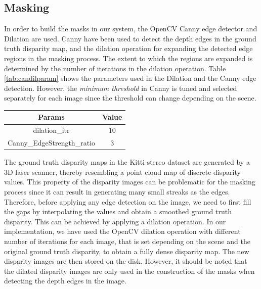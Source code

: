 \subsection{Masking}
In order to build the masks in our system, the OpenCV Canny edge detector and Dilation are used.
Canny have been used to detect the depth edges in the ground truth disparity map, and the dilation operation 
for expanding the detected edge regions in the masking process. The extent to which the regions are expanded
is determined by the number of iterations in the dilation operation. Table \ref{tab:candilparam} shows the parameters used in the Dilation
and the Canny edge detection. However, the \textit{minimum threshold} in Canny is tuned and selected separately for each image 
since the threshold can change depending on the scene.

{\footnotesize
\begin{minipage}{\linewidth}
\begin{center}
\label{tab:candilparam}
\begin{tabular}{ |c|c| }
\hline
\textbf{Params} & \textbf{Value} \\ \hline
dilation\_itr & 10 \\  \hline
Canny\_EdgeStrength\_ratio & 3 \\ \hline
\end{tabular}
\end{center}
\end{minipage} \newline
}

The ground truth disparity maps in the Kitti stereo dataset are generated by a 3D laser scanner, thereby resembling
a point cloud map of discrete disparity values. This property of the disparity images 
can be problematic for the masking process since it can result in generating many small streaks as the edges.
Therefore, before applying any edge
detection on the image, we need to first fill the gaps by interpolating the values and obtain a smoothed ground truth disparity.
This can be achieved by applying a dilation operation.
In our implementation, we have used the OpenCV dilation operation with different number of iterations for each image, that is set depending on the scene 
and the original ground truth disparity, to obtain a fully dense disparity map. 
The new disparity images are then stored on the disk. 
However, it should be noted that the dilated disparity images are only used in the construction of the masks when detecting the depth
edges in the image.

